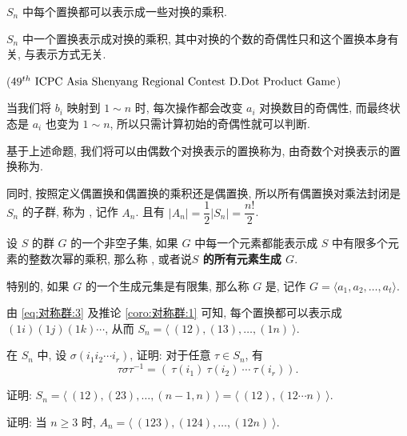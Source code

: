 \begin{corollary}\label{coro:对称群:1}
	 $S_n$ 中每个置换都可以表示成一些对换的乘积.
\end{corollary}

\begin{proposition}
	$S_n$ 中一个置换表示成对换的乘积, 其中对换的个数的奇偶性只和这个置换本身有关, 与表示方式无关.
\end{proposition}

\begin{example}(\href{https://qoj.ac/contest/1865/problem/9801}{$49^{th}\ \text {ICPC Asia Shenyang Regional Contest D.Dot Product Game}$})

	当我们将 $b_i$ 映射到 $1\sim n$ 时, 每次操作都会改变 $a_i$ 对换数目的奇偶性, 而最终状态是 $a_i$ 也变为 $1\sim n$, 所以只需计算初始的奇偶性就可以判断.
\end{example}

\begin{definition}
	基于上述命题, 我们将可以由偶数个对换表示的置换称为, 由奇数个对换表示的置换称为.

	同时, 按照定义偶置换和偶置换的乘积还是偶置换, 所以所有偶置换对乘法封闭是 $S_n$ 的子群, 称为 , 记作 $A_n$. 且有 $|A_n|=\dfrac 1 2 |S_n|=\dfrac{n!} 2$.
\end{definition}

\begin{definition}
	设 $S$ 的群 $G$ 的一个非空子集, 如果 $G$ 中每一个元素都能表示成 $S$ 中有限多个元素的整数次幂的乘积, 那么称 , 或者说\textbf{$S$ 的所有元素生成 $G$}.

	特别的, 如果 $G$ 的一个生成元集是有限集, 那么称 $G$ 是, 记作 $G=\langle a_1,a_2,\ldots,a_t\rangle$.
\end{definition}

\begin{corollary}
	由 \eqref{eq:对称群:3} 及推论 \ref{coro:对称群:1} 可知, 每个置换都可以表示成 $(1i)(1j)(1k)\cdots$, 从而 $S_n=\langle\ (12),(13),\ldots,(1n)\ \rangle$.
\end{corollary}

\begin{practice}
	\problem 在 $S_n$ 中, 设 $\sigma(i_1i_2\cdots i_r)$, 证明: 对于任意 $\tau\in S_n$, 有
	\begin{equation*}
		\tau\sigma\tau^{-1}=(\ \tau(i_1)\ \tau(i_2)\ \cdots\ \tau(i_r)).
	\end{equation*}

	\problem 证明: $S_n=\langle\ (12),(23),\ldots,(n-1,n)\ \rangle=\langle\ (12),(12\cdots n)\ \rangle$.

	\problem 证明: 当 $n\geqslant 3$ 时, $A_n=\langle\ (123),(124),\ldots,(12n)\ \rangle$.
\end{practice}